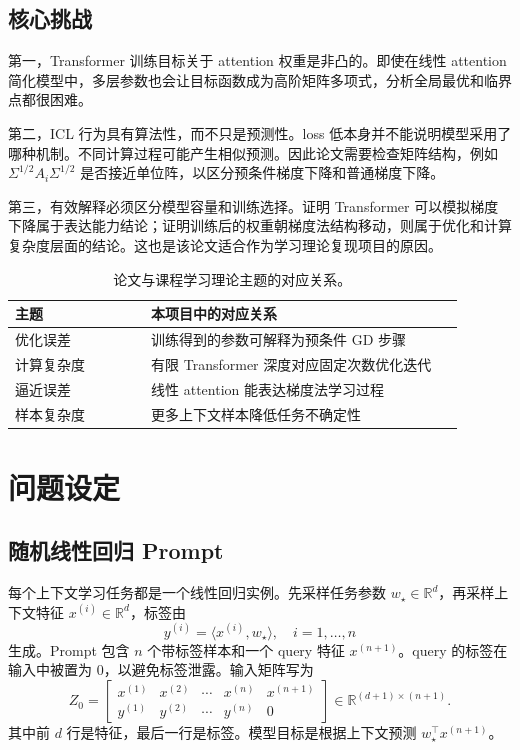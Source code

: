\documentclass[conference]{IEEEtran}
\newcommand{\R}{\mathbb{R}}
\newcommand{\wstar}{w_\star}
\begin{document}
\subsection{核心挑战}
第一，Transformer 训练目标关于 attention 权重是非凸的。即使在线性 attention 简化模型中，多层参数也会让目标函数成为高阶矩阵多项式，分析全局最优和临界点都很困难。

第二，ICL 行为具有算法性，而不只是预测性。loss 低本身并不能说明模型采用了哪种机制。不同计算过程可能产生相似预测。因此论文需要检查矩阵结构，例如 $\Sigma^{1/2}A_i\Sigma^{1/2}$ 是否接近单位阵，以区分预条件梯度下降和普通梯度下降。

第三，有效解释必须区分模型容量和训练选择。证明 Transformer 可以模拟梯度下降属于表达能力结论；证明训练后的权重朝梯度法结构移动，则属于优化和计算复杂度层面的结论。这也是该论文适合作为学习理论复现项目的原因。

\begin{table}[!t]
\centering
\caption{论文与课程学习理论主题的对应关系。}
\label{tab:course_fit}
\begin{tabular}{p{0.27\linewidth}p{0.62\linewidth}}
\toprule
主题 & 本项目中的对应关系\\
\midrule
优化误差 & 训练得到的参数可解释为预条件 GD 步骤\\
计算复杂度 & 有限 Transformer 深度对应固定次数优化迭代\\
逼近误差 & 线性 attention 能表达梯度法学习过程\\
样本复杂度 & 更多上下文样本降低任务不确定性\\
\bottomrule
\end{tabular}
\end{table}

\section{问题设定}
\subsection{随机线性回归 Prompt}
每个上下文学习任务都是一个线性回归实例。先采样任务参数 $\wstar \in \R^d$，再采样上下文特征 $x^{(i)}\in\R^d$，标签由
\begin{equation}
y^{(i)} = \langle x^{(i)}, \wstar \rangle,\quad i=1,\ldots,n
\end{equation}
生成。Prompt 包含 $n$ 个带标签样本和一个 query 特征 $x^{(n+1)}$。query 的标签在输入中被置为 $0$，以避免标签泄露。输入矩阵写为
\begin{equation}
Z_0 =
\begin{bmatrix}
x^{(1)} & x^{(2)} & \cdots & x^{(n)} & x^{(n+1)}\\
y^{(1)} & y^{(2)} & \cdots & y^{(n)} & 0
\end{bmatrix}
\in \R^{(d+1)\times(n+1)}.
\end{equation}
其中前 $d$ 行是特征，最后一行是标签。模型目标是根据上下文预测 $\wstar^\top x^{(n+1)}$。
\end{document}
